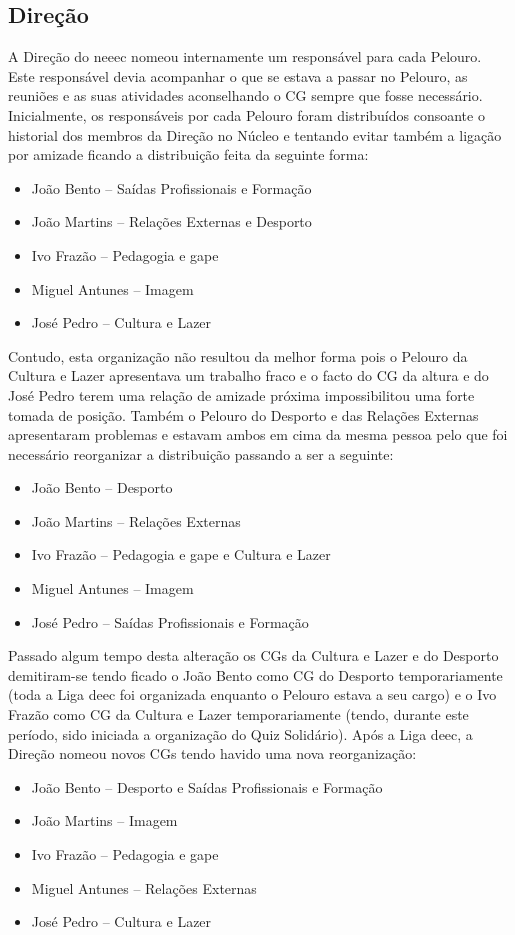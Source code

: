 
\subsection{Direção}

A Direção do \acrshort{neeec} nomeou internamente um responsável para cada Pelouro. Este responsável devia acompanhar o que se estava a passar no Pelouro, as reuniões e as suas atividades aconselhando o CG sempre que fosse necessário.
Inicialmente, os responsáveis por cada Pelouro foram distribuídos consoante o historial dos membros da Direção no Núcleo e tentando evitar também a ligação por amizade ficando a distribuição feita da seguinte forma:
\begin{itemize}
\item João Bento – Saídas Profissionais e Formação
\item João Martins –  Relações Externas e Desporto
\item Ivo Frazão – Pedagogia e \acrshort{gape}
\item Miguel Antunes – Imagem
\item José Pedro – Cultura e Lazer
\end{itemize}

Contudo, esta organização não resultou da melhor forma pois o Pelouro da Cultura e Lazer apresentava um trabalho fraco e o facto do CG da altura e do José Pedro terem uma relação de amizade próxima impossibilitou uma forte tomada de posição. Também o Pelouro do Desporto e das Relações Externas apresentaram problemas e estavam ambos em cima da mesma pessoa pelo que foi necessário reorganizar a distribuição passando a ser a seguinte:
\begin{itemize}
\item João Bento – Desporto
\item João Martins –  Relações Externas
\item Ivo Frazão – Pedagogia e \acrshort{gape} e Cultura e Lazer
\item Miguel Antunes – Imagem
\item José Pedro – Saídas Profissionais e Formação
\end{itemize}

Passado algum tempo desta alteração os CGs da Cultura e Lazer e do Desporto demitiram-se tendo ficado o João Bento como CG do Desporto temporariamente (toda a Liga \acrshort{deec} foi organizada enquanto o Pelouro estava a seu cargo) e o Ivo Frazão como CG da Cultura e Lazer temporariamente (tendo, durante este período, sido iniciada a organização do Quiz Solidário). Após a Liga \acrshort{deec}, a Direção nomeou novos CGs tendo havido uma nova reorganização:
\begin{itemize}
\item João Bento – Desporto e Saídas Profissionais e Formação
\item João Martins –  Imagem
\item Ivo Frazão – Pedagogia e \acrshort{gape}
\item Miguel Antunes – Relações Externas
\item José Pedro – Cultura e Lazer
\end{itemize}

